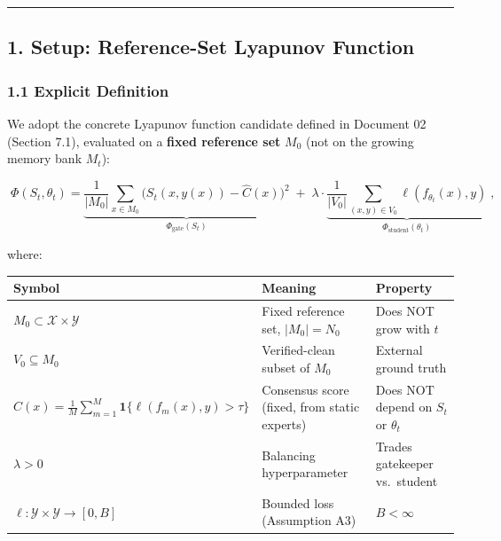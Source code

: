 \documentclass[
  12pt,
]{article}
\begin{document}
\begin{center}\rule{0.5\linewidth}{0.5pt}\end{center}

\subsection{1. Setup: Reference-Set Lyapunov
Function}\label{setup-reference-set-lyapunov-function}

\subsubsection{1.1 Explicit Definition}\label{explicit-definition}

We adopt the concrete Lyapunov function candidate defined in Document 02
(Section 7.1), evaluated on a \textbf{fixed reference set} \(M_0\) (not
on the growing memory bank \(M_t\)):

\[\boxed{\;\Phi(S_t, \theta_t) = \underbrace{\frac{1}{|M_0|} \sum_{x \in M_0} \bigl(S_t(x, y(x)) - \hat{C}(x)\bigr)^2}_{\Phi_{\text{gate}}(S_t)} \;+\; \lambda \cdot \underbrace{\frac{1}{|V_0|} \sum_{(x,y) \in V_0} \ell(f_{\theta_t}(x), y)}_{\Phi_{\text{student}}(\theta_t)}\;},\]

where:

\begin{longtable}[]{@{}
  >{\raggedright\arraybackslash}p{}
  >{\raggedright\arraybackslash}p{}
  >{\raggedright\arraybackslash}p{}@{}}
\toprule\noalign{}
\begin{minipage}[b]{\linewidth}\raggedright
Symbol
\end{minipage} & \begin{minipage}[b]{\linewidth}\raggedright
Meaning
\end{minipage} & \begin{minipage}[b]{\linewidth}\raggedright
Property
\end{minipage} \\
\midrule\noalign{}
\endhead
\bottomrule\noalign{}
\endlastfoot
\(M_0 \subset \mathcal{X} \times \mathcal{Y}\) & Fixed reference set,
\(|M_0| = N_0\) & Does NOT grow with \(t\) \\
\(V_0 \subseteq M_0\) & Verified-clean subset of \(M_0\) & External
ground truth \\
\(\hat{C}(x) = \frac{1}{M}\sum_{m=1}^M \mathbf{1}\{\ell(f_m(x), y) > \tau\}\)
& Consensus score (fixed, from static experts) & Does NOT depend on
\(S_t\) or \(\theta_t\) \\
\(\lambda > 0\) & Balancing hyperparameter & Trades gatekeeper
vs.~student \\
\(\ell: \mathcal{Y} \times \mathcal{Y} \to [0, B]\) & Bounded loss
(Assumption A3) & \(B < \infty\) \\
\end{longtable}
\end{document}
